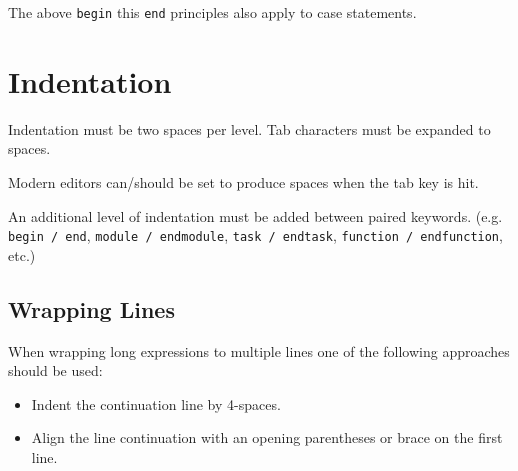     \begin{badbox}
      
    \end{badbox}

    The above \lstinline{begin} this \lstinline{end} principles also apply to case statements.

    \begin{goodbox}
      
    \end{goodbox}

    \begin{badbox}
      
    \end{badbox}

  \section{Indentation}
  \label{systemverilog_conventions:indentation}

    \begin{keybox}
      Indentation must be two spaces per level.
      Tab characters must be expanded to spaces.
    \end{keybox}

    Modern editors can/should be set to produce spaces when the tab key is hit.

    \begin{keybox}
      An additional level of indentation must be added between paired keywords.
      (e.g. \lstinline{begin / end}, \lstinline{module / endmodule}, \lstinline{task / endtask}, \lstinline{function / endfunction}, etc.)
    \end{keybox}

    \subsection{Wrapping Lines}
    \label{systemverilog_conventions:indentation:wrapping_lines}

      When wrapping long expressions to multiple lines one of the following approaches should be used:

      \begin{itemize}
        \item Indent the continuation line by 4-spaces.
        \item Align the line continuation with an opening parentheses or brace on the first line.
      \end{itemize}

